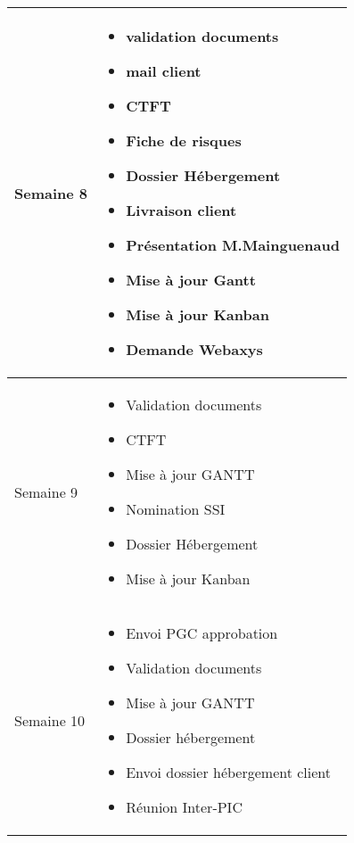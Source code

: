 \documentclass [a4paper] {article}
\begin{document}
\begin{tabularx}{16.8cm}{|>{\columncolor{gray!40}}l|X|}
	\hline
	Semaine 8 & \begin{itemize}
		\item validation documents
		\item mail client
		\item CTFT
		\item Fiche de risques
		\item Dossier Hébergement
		\item Livraison client
		\item Présentation M.Mainguenaud
		\item Mise à jour Gantt
		\item Mise à jour Kanban
		\item Demande Webaxys
	\end{itemize} \\
	\hline
	Semaine 9 & \begin{itemize}
		\item Validation documents
		\item CTFT
		\item Mise à jour GANTT
		\item Nomination SSI
		\item Dossier Hébergement
		\item Mise à jour Kanban
	\end{itemize} \\
	\hline
	Semaine 10 & \begin{itemize}
		\item Envoi PGC approbation
		\item Validation documents
		\item Mise à jour GANTT
		\item Dossier hébergement
		\item Envoi dossier hébergement client
		\item Réunion Inter-PIC
	\end{itemize}
	\hline
\end{tabularx}
\end{document}
